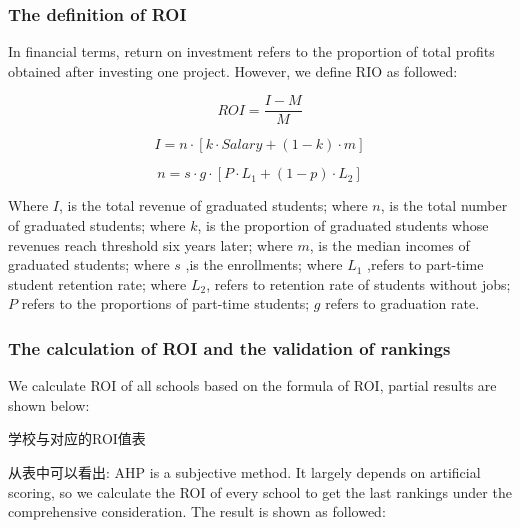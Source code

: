 \documentclass{mcmthesis}
\begin{document}
\subsubsection{The definition of ROI}
In financial terms, return on investment refers to the proportion of total profits obtained after investing one project. However, we define RIO as followed:

\begin{equation}
ROI = \frac{I - M}{M}
\end{equation}

\begin{equation}
I = n  \cdot [k \cdot Salary + (1-k) \cdot m]
\end{equation}

\begin{equation}
n = s \cdot g \cdot [P \cdot L_1 + (1-p) \cdot L_2]
\end{equation}

Where $I$, is the total revenue of graduated students; 
where $n$, is the total number of graduated students; 
where $k$, is the proportion of graduated students whose revenues reach threshold six years later; 
where $m$, is the median incomes of graduated students; 
where $s$ ,is the enrollments; 
where $L_1$ ,refers to part-time student retention rate; 
where $L_2$, refers to retention rate of students without jobs; 
$P$ refers to the proportions of part-time students; 
$g$ refers to graduation rate.

\subsubsection{The calculation of ROI and the validation of rankings}
We calculate ROI of all schools based on the formula of ROI, partial results are shown below:

学校与对应的ROI值表

从表中可以看出:
AHP is a subjective method. It largely depends on artificial scoring, so we calculate the ROI of every school to get the last rankings under the comprehensive consideration. The result is shown as followed:
\end{document}
